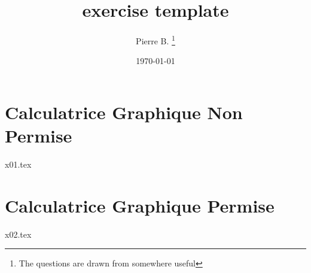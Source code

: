 \documentclass[10pt]{article}
\newcounter{question}
\begin{document}
 
\title{exercise template}
\author{Pierre B. \thanks{The questions are drawn from somewhere useful}}
\date{\today}
\maketitle

\newpage
\section*{\textbf{Calculatrice Graphique Non Permise}}
{x01.tex}
\bigskip
\section*{\textbf{Calculatrice Graphique Permise}}
{x02.tex}
\end{document}
